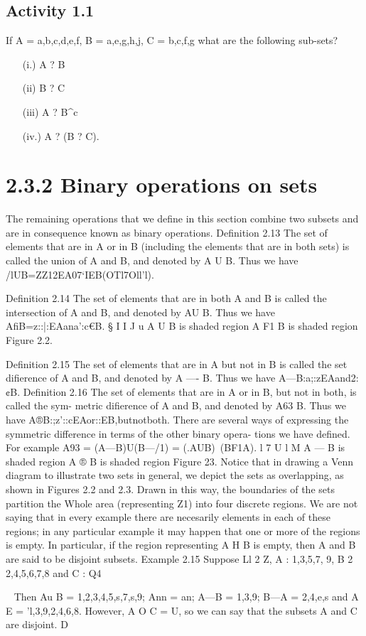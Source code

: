{{{\subsection{Activity 1.1}
\smallskip If A = {a,b,c,d,e,f}, B = {a,e,g,h,j}, C = {b,c,f,g} what are the following sub-sets?
\begin{itemize}
\item[(i.)] A ? B
\item[(ii)] B ? C
\item[(iii)] A ? B^c
\item[(iv.)] A ? (B ? C).
\end{itemize}
\smallskip 
\section{2.3.2 Binary operations on sets}
The remaining operations that we deﬁne in this section combine two subsets and are in consequence
known as binary operations.
Deﬁnition 2.13 The set of elements that are in A or in B (including the elements that are in
both sets) is called the union of A and B, and denoted by A U B. Thus we have
/lUB={ZZ12EA07‘IEB(OTl7Oll'l)}.

Deﬁnition 2.14 The set of elements that are in both A and B is called the intersection of A
and B, and denoted by AU B. Thus we have
AﬁB={z::|:EAana':c€B}.
§
I  I J u
A U B is shaded region A F1 B is shaded region
Figure 2.2.


Deﬁnition 2.15 The set of elements that are in A but not in B is called the set diﬁerence of
A and B, and denoted by A —- B. Thus we have
A—B:{a;:zEAand2:¢B}.
Deﬁnition 2.16 The set of elements that are in A or in B, but not in both, is called the sym-
metric diﬁerence of A and B, and denoted by A63 B. Thus we have
A®B:{;z'::cEAor::EB,butnotboth}.
There are several ways of expressing the symmetric difference in terms of the other binary opera-
tions we have deﬁned. For example
A93 = (A—B)U(B—/1)
= (.AUB)~(BF1A).
l 7 U l   M
A — B is shaded region A ® B is shaded region
Figure 23.
Notice that in drawing a Venn diagram to illustrate two sets in general, we depict the sets as
overlapping, as shown in Figures 2.2 and 2.3. Drawn in this way, the boundaries of the sets
partition the Whole area (representing Z1) into four discrete regions. We are not saying that in
every example there are necesarily elements in each of these regions; in any particular example
it may happen that one or more of the regions is empty. In particular, if the region representing
A H B is empty, then A and B are said to be disjoint subsets.
Example 2.15 Suppose Ll 2 Z, A : {1,3,5,7, 9}, B 2 {2,4,5,6,7,8} and C : {Q}4}~ Then
Au B = {1,2,3,4,5,s,7,s,9}; Ann = {an}; A—B = {1,3,9}; B—A = {2,4,e,s} and
A  E = {'l,3,9,2,4,6,8}. However, A O C = U, so we can say that the subsets A and C are
disjoint. D

}}

